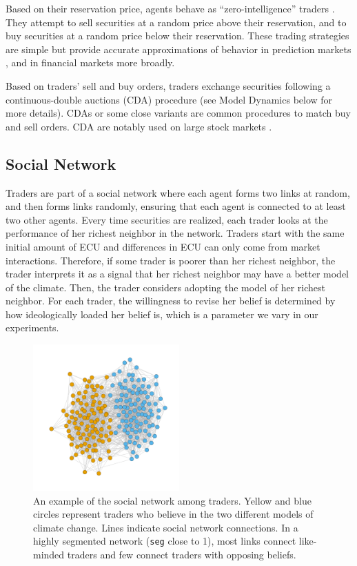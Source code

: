 \documentclass{wscpaperproc}\usepackage[]{graphicx}\usepackage[]{color}
\begin{document}
   
Based on their reservation price, agents behave as ``zero-intelligence'' traders .
They attempt to sell securities at a random price above their reservation, and to buy securities at a random price below their reservation.
These trading strategies are simple but provide accurate approximations of behavior in prediction markets , and in financial markets more broadly.

Based on traders' sell and buy orders, traders exchange securities following a continuous-double auctions (CDA) procedure (see Model Dynamics below for more details). 
CDAs or some close variants are common procedures to match buy and sell orders. 
CDA are notably used on large stock markets .
 
\subsection{Social Network}

Traders are part of a social network where each agent forms two links at random, and then forms links randomly, ensuring that each agent is connected to at least two other agents. 
Every time securities are realized, each trader looks at the performance of her richest neighbor in the network. 
Traders start with the same initial amount of ECU and differences in ECU can only come from market interactions.
Therefore, if some trader is poorer than her richest neighbor, the trader interprets it as a signal that her richest neighbor may have a better model of the climate.
Then, the trader considers adopting the model of her richest neighbor. 
For each trader, the willingness to revise her belief is determined by how ideologically loaded her belief is, which is a parameter we vary in our experiments.
\begin{figure}[t]
\begin{center}
\includegraphics[width=0.50\textwidth]{output/network.pdf}
\caption{An example of the social network among traders. Yellow and blue circles represent traders who believe in the two different models of climate change. Lines indicate social network connections. In a highly segmented network (\texttt{seg} close to 1), most links connect like-minded traders and few connect traders with opposing beliefs.}\label{fig:social_network}%
\end{center}
\end{figure}
\end{document}
